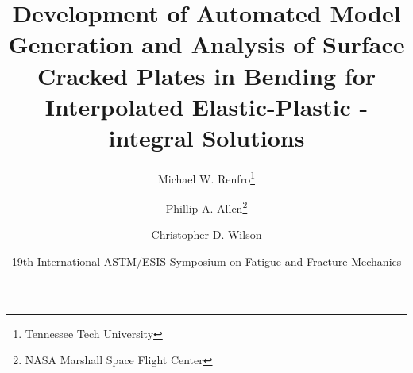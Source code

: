 \makeatletter
\def\beamer@framenotesbegin{%
  \gdef\beamer@noteitems{}%
  \gdef\beamer@notes{{}}%
}
\makeatother
{}

\usepackage{listings}
\lstset{basicstyle=\ttfamily\small}
\usepackage{graphicx} \graphicspath{{content/figures/}}
\usepackage{booktabs}
\usepackage{cool}
\usepackage{bm} %
\usepackage{siunitx}
\usepackage[backend=biber,natbib=true,style=authoryear,sorting=none,firstinits=true]{biblatex}





\author[Renfro, Allen, Wilson]{Michael W. Renfro\thanks{Tennessee Tech University} \and Phillip A. Allen\thanks{NASA Marshall Space Flight Center} \and Christopher D. Wilson\footnotemark[1]}

\title[Development of Automated Models for EP SC(B) Plates]{Development of Automated Model Generation and Analysis of Surface Cracked Plates in Bending for Interpolated Elastic-Plastic \J-integral Solutions}

\date{19th International ASTM/ESIS Symposium on Fatigue and Fracture Mechanics}



\newcommand{\linktopage}[2]{\structure{\hyperlink{Navigation#1}{#2}}}



\begin{frame}[plain]
\maketitle
{}
\end{frame}

